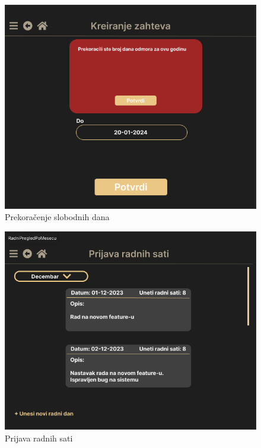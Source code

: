 \documentclass[a4paper]{article}
\begin{document}
\begin{figure} [!ht]
    \begin{center}
        \includegraphics[scale=0.25]{UI/Zaposleni/Prekoracenje.png}
    \end{center}
\caption{Prekoračenje slobodnih dana}
\end{figure}

\begin{figure} [!ht]
    \begin{center}
        \includegraphics[scale=0.25]{UI/Zaposleni/RadniSati.png}
    \end{center}
\caption{Prijava radnih sati}
\end{figure}
\end{document}
